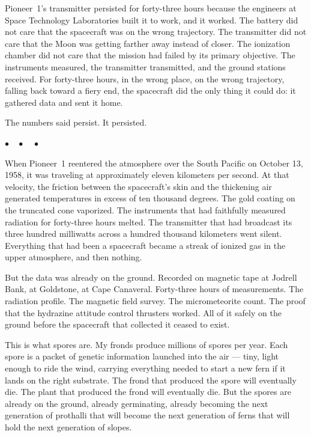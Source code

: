 \documentclass[12pt, letterpaper]{article}
\begin{document}
Pioneer~1's transmitter persisted for forty-three hours because the engineers at Space Technology Laboratories built it to work, and it worked. The battery did not care that the spacecraft was on the wrong trajectory. The transmitter did not care that the Moon was getting farther away instead of closer. The ionization chamber did not care that the mission had failed by its primary objective. The instruments measured, the transmitter transmitted, and the ground stations received. For forty-three hours, in the wrong place, on the wrong trajectory, falling back toward a fiery end, the spacecraft did the only thing it could do: it gathered data and sent it home.

The numbers said persist. It persisted.

\begin{center}
$\bullet\quad\bullet\quad\bullet$
\end{center}

When Pioneer~1 reentered the atmosphere over the South Pacific on October 13, 1958, it was traveling at approximately eleven kilometers per second. At that velocity, the friction between the spacecraft's skin and the thickening air generated temperatures in excess of ten thousand degrees. The gold coating on the truncated cone vaporized. The instruments that had faithfully measured radiation for forty-three hours melted. The transmitter that had broadcast its three hundred milliwatts across a hundred thousand kilometers went silent. Everything that had been a spacecraft became a streak of ionized gas in the upper atmosphere, and then nothing.

But the data was already on the ground. Recorded on magnetic tape at Jodrell Bank, at Goldstone, at Cape Canaveral. Forty-three hours of measurements. The radiation profile. The magnetic field survey. The micrometeorite count. The proof that the hydrazine attitude control thrusters worked. All of it safely on the ground before the spacecraft that collected it ceased to exist.

This is what spores are. My fronds produce millions of spores per year. Each spore is a packet of genetic information launched into the air --- tiny, light enough to ride the wind, carrying everything needed to start a new fern if it lands on the right substrate. The frond that produced the spore will eventually die. The plant that produced the frond will eventually die. But the spores are already on the ground, already germinating, already becoming the next generation of prothalli that will become the next generation of ferns that will hold the next generation of slopes.
\end{document}
